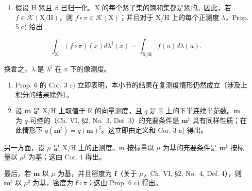 \begin{enumerate}
\def\labelenumi{\arabic{enumi})}
\setcounter{enumi}{1}
\tightlist
\item
  假设 H 紧且 \(\beta\) 已归一化。X 的每个紧子集的饱和集都是紧的。因此，若 \(f \in \mathcal{K}(\mathrm{X}/\mathrm{H})\)，则 \(f \circ \pi \in \mathcal{K}(\mathrm{X})\)；并且对于 X/H 上的每个正测度 \(\lambda\)，Prop. 5 c) 给出
\end{enumerate}

\[
\int_ {\mathrm{X}} (f \circ \pi) (x) d \lambda^ {\sharp} (x) = \int_ {\mathrm{X/H}} f (u) d \lambda (u).
\]

换言之，\(\lambda\) 是 \(\lambda^{\sharp}\) 在 \(\pi\) 下的像测度。

\begin{enumerate}
\def\labelenumi{\arabic{enumi})}
\setcounter{enumi}{2}
\item
  Prop. 6 的 Cor. 3 c) 立即表明，本小节的结果在复测度情形仍然成立（涉及上积分的结果除外）。
\item
  设 \(\mathbf{m}\) 是 X/H 上取值于 E 的向量测度，且 \(q\) 是 E 上的下半连续半范数。\(\mathbf{m}\) 为 \(q\)-可控的（Ch. VI, §2, No.~3, Def. 3）的充要条件是 \(\mathbf{m}^{\sharp}\) 具有同样性质；在此情形下 \(q(\mathbf{m}^{\sharp}) = q(\mathbf{m})^{\sharp}\)。这立即由定义和 Cor. 3 a) 得出。
\end{enumerate}

另一方面，设 \(\mu\) 是 X/H 上的正测度。m 按标量以 \(\mu\) 为基的充要条件是 \(\mathbf{m}^{\sharp}\) 按标量以 \(\mu^{\sharp}\) 为基；这由 Cor. 1 得出。

最后，若 \(\mathbf{m}\) 以 \(\mu\) 为基，并且密度为 \(\mathbf{f}\)（关于 \(\mu\)，Ch. VI, §2, No.~4, Def. 4），则 \(\mathbf{m}^{\sharp}\) 以 \(\mu^{\sharp}\) 为基，密度为 \(\mathbf{f} \circ \pi\)：这由 Prop. 6 c) 得出。

